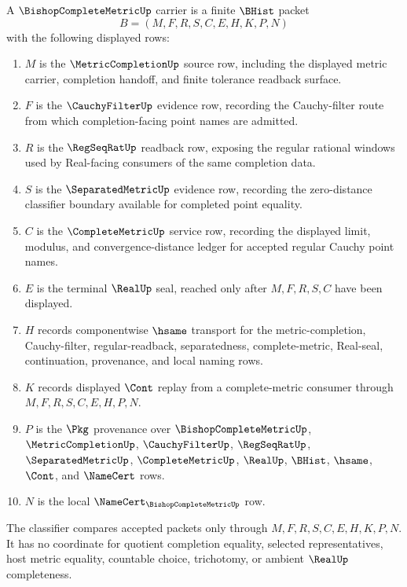 \begin{definition}
\label{def:bishop-complete-metric-carrier}
A $\BishopCompleteMetricUp$ carrier is a finite $\BHist$ packet
$$
B=(M,F,R,S,C,E,H,K,P,N)
$$
with the following displayed rows:
\begin{enumerate}
\item $M$ is the $\MetricCompletionUp$ source row, including the displayed metric carrier, completion handoff, and finite tolerance readback surface.
\item $F$ is the $\CauchyFilterUp$ evidence row, recording the Cauchy-filter route from which completion-facing point names are admitted.
\item $R$ is the $\RegSeqRatUp$ readback row, exposing the regular rational windows used by Real-facing consumers of the same completion data.
\item $S$ is the $\SeparatedMetricUp$ evidence row, recording the zero-distance classifier boundary available for completed point equality.
\item $C$ is the $\CompleteMetricUp$ service row, recording the displayed limit, modulus, and convergence-distance ledger for accepted regular Cauchy point names.
\item $E$ is the terminal $\RealUp$ seal, reached only after $M,F,R,S,C$ have been displayed.
\item $H$ records componentwise $\hsame$ transport for the metric-completion, Cauchy-filter, regular-readback, separatedness, complete-metric, Real-seal, continuation, provenance, and local naming rows.
\item $K$ records displayed $\Cont$ replay from a complete-metric consumer through $M,F,R,S,C,E,H,P,N$.
\item $P$ is the $\Pkg$ provenance over $\BishopCompleteMetricUp$, $\MetricCompletionUp$, $\CauchyFilterUp$, $\RegSeqRatUp$, $\SeparatedMetricUp$, $\CompleteMetricUp$, $\RealUp$, $\BHist$, $\hsame$, $\Cont$, and $\NameCert$ rows.
\item $N$ is the local $\NameCert_{\BishopCompleteMetricUp}$ row.
\end{enumerate}
The classifier compares accepted packets only through $M,F,R,S,C,E,H,K,P,N$. It has no coordinate for quotient completion equality, selected representatives, host metric equality, countable choice, trichotomy, or ambient $\RealUp$ completeness.
\end{definition}

